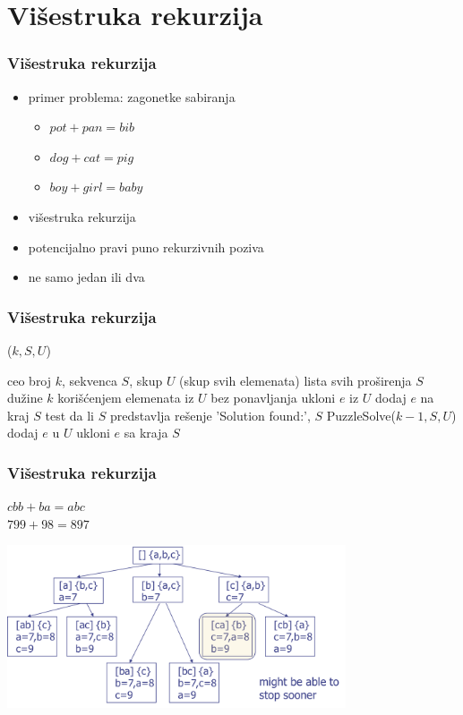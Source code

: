 \documentclass[compress,aspectratio=169]{beamer}
\begin{document}
\section[Višestruka rekurzija]{Višestruka rekurzija}
\begin{frame}[fragile]
  \frametitle{Višestruka rekurzija}
\begin{itemize}
  \item primer problema: zagonetke sabiranja
  \begin{itemize}
    \item $pot + pan = bib$
    \item $dog + cat = pig$
    \item $boy + girl = baby$
  \end{itemize}
  \item višestruka rekurzija
  \item potencijalno pravi puno rekurzivnih poziva
  \item ne samo jedan ili dva
\end{itemize}
\end{frame}

\begin{frame}[fragile,shrink=12]
  \frametitle{Višestruka rekurzija}
($k, S, U$)
\begin{algorithmic}
\REQUIRE ceo broj $k$, sekvenca $S$, skup $U$ (skup svih elemenata)
\ENSURE lista svih proširenja $S$ dužine $k$ korišćenjem elemenata iz $U$ bez ponavljanja
  \STATE ukloni $e$ iz $U$ 
  \STATE dodaj $e$ na kraj $S$
    \STATE test da li $S$ predstavlja rešenje
      \RETURN 'Solution found:', $S$
    \ENDIF
  \ELSE
    \STATE PuzzleSolve($k-1, S, U$)
    \STATE dodaj $e$ u $U$ 
    \STATE ukloni $e$ sa kraja $S$
  \ENDIF
\ENDFOR
\end{algorithmic}
\end{frame}

\begin{frame}[fragile]
  \frametitle{Višestruka rekurzija}
  $cbb + ba = abc$ \\
  $799 + 98 = 897$
  \begin{center}
    \includegraphics[width=10cm]{asp-02-pic08.png}
  \end{center}
\end{frame}
\end{document}
